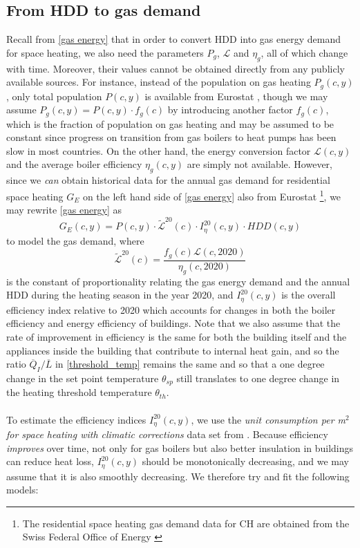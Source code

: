 \documentclass[12pt]{article}
\def\be{\begin{equation}}
\def\ee{\end{equation}}
\begin{document}
\subsection{From HDD to gas demand}
Recall from \eqref{gas energy} that in order to convert HDD into gas energy demand for space heating, we also need the parameters $P_g$, $\mathcal{L}$ and $\eta_g$, all of which change with time. Moreover, their values cannot be obtained directly from any publicly available sources. For instance, instead of the population on gas heating $P_g(c,y)$, only total population $P(c,y)$ is available from Eurostat \cite{Eurostat2}, though we may assume $P_g(c,y)=P(c,y) \cdot f_g(c)$ by introducing another factor $f_g(c)$, which is the fraction of population on gas heating and may be assumed to be constant since progress on transition from gas boilers to heat pumps has been slow in most countries. On the other hand, the energy conversion factor $\mathcal{L}(c,y)$ and the average boiler efficiency $\eta_g(c,y)$ are simply not available. However, since we \textit{can} obtain historical data for the annual gas demand for residential space heating $G_E$ on the left hand side of \eqref{gas energy} also from Eurostat \cite{Eurostat1}\footnote{The residential space heating gas demand data for CH are obtained from the Swiss Federal Office of Energy \cite{SFOE}}, we may rewrite \eqref{gas energy} as
\be 
G_E(c,y) = P(c,y) \cdot \tilde{\mathcal{L}}^{20}(c) \cdot I_\eta^{20}(c,y) \cdot {HDD}(c,y)  \label{gas_model}
\ee
to model the gas demand, where
\be
\tilde{\mathcal{L}}^{20}(c) = \frac{f_g(c) \mathcal{L}(c, 2020)}{\eta_g(c, 2020)}
\ee
is the constant of proportionality relating the gas energy demand and the annual HDD during the heating season in the year 2020, and $I_\eta^{20}(c,y)$ is the overall efficiency index relative to 2020 which accounts for changes in both the boiler efficiency and energy efficiency of buildings. Note that we also assume that the rate of improvement in efficiency is the same for both the building itself and the appliances inside the building that contribute to internal heat gain, and so the ratio $\overline{Q}_I/\overline{L}$ in \eqref{threshold_temp} remains the same and so that a one degree change in the set point temperature $\theta_{sp}$ still translates to one degree change in the heating threshold temperature $\theta_{th}$. \\
\\
To estimate the efficiency indices $I_\eta^{20}(c,y)$, we use the \textit{unit consumption per m$^2$ for space heating with climatic corrections} data set from \cite{ODYSSEE}. Because efficiency \textit{improves} over time, not only for gas boilers but also better insulation in buildings can reduce heat loss, $I_\eta^{20}(c,y)$ should be monotonically decreasing, and we may assume that it is also smoothly decreasing. We therefore try and fit the following models:
\end{document}
